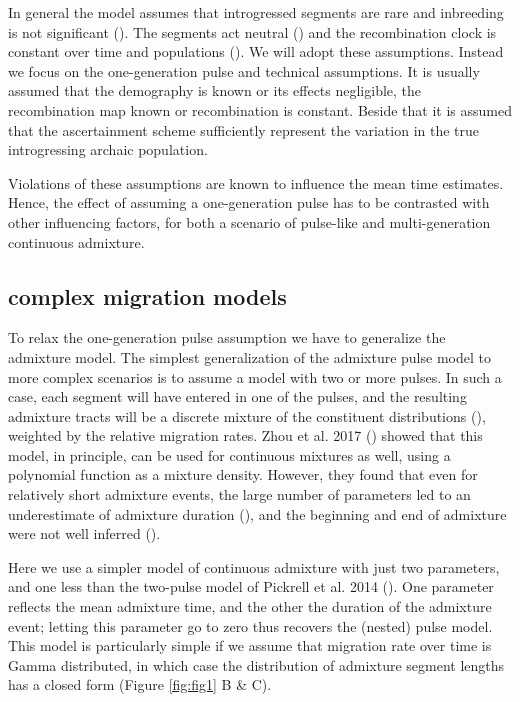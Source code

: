 \documentclass[]{article}
\begin{document}
In general the model assumes that introgressed segments are rare and inbreeding is not significant (\cite{pool_inference_2009}). The segments act neutral (\cite{shchur_distribution_2019}) and the recombination clock is constant over time and populations (\cite{gravel_population_2012}). We will adopt these assumptions. Instead we focus on the one-generation pulse and technical assumptions. It is usually assumed that the demography is known or its effects negligible, the recombination map known or recombination is constant. Beside that it is assumed that the ascertainment scheme sufficiently represent the variation in the true introgressing archaic population.

Violations of these assumptions are known to influence the mean time
estimates. Hence, the effect of assuming a one-generation pulse has to
be contrasted with other influencing factors, for both a scenario of
pulse-like and multi-generation continuous admixture. 


\subsection{complex migration models}

To relax the one-generation pulse assumption we have to generalize the admixture model.
The simplest generalization of the admixture pulse model to more complex scenarios is to assume a model with two or more pulses. In such a case,  each segment will have entered in one of the pulses, and the resulting admixture tracts will be a discrete mixture of the constituent distributions (\cite{pickrell_ancient_2014}), weighted by the relative migration rates. Zhou et al. 2017 (\cite{zhou_modeling_2017}) showed that this model, in principle, can be used for continuous mixtures as well, using a polynomial function as a mixture density. However, they found that even for relatively short admixture events, the large number of parameters led to an underestimate of admixture duration (\cite{zhou_inference_2017}), and the beginning and end of admixture were not well inferred
(\cite{zhou_modeling_2017,zhou_inference_2017}). 

Here we use a simpler model of continuous admixture with just two parameters, and one less than the two-pulse model of Pickrell et al. 2014 (\cite{pickrell_ancient_2014}). One parameter reflects the mean admixture time, and the other the duration of the admixture event; letting this parameter go to zero thus recovers the (nested) pulse model. 
This model is particularly simple if we assume that migration rate over time is Gamma distributed, in which case the distribution of admixture segment lengths has a closed form (Figure \ref{fig:fig1} B & C).
\end{document}

